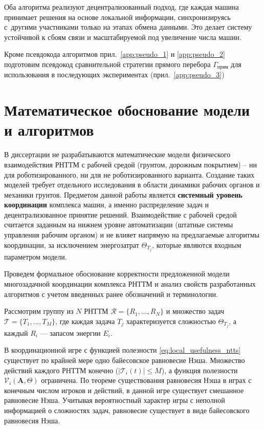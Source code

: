Оба алгоритма реализуют децентрализованный подход, где каждая машина принимает решения на основе локальной информации, синхронизируясь с~другими участниками только на этапах обмена данными. Это делает систему устойчивой к сбоям связи и масштабируемой под увеличение числа машин.

Кроме псевдокода алгоритмов прил.\ \ref{app:pseudo_1} и \ref{app:pseudo_2} подготовим псевдокод сравнительной стратегии прямого перебора $\Gamma_{\text{прям}}$ для использования в последующих экспериментах (прил.\ \ref{app:pseudo_3})

\section{Математическое обоснование модели и алгоритмов}

В диссертации не разрабатываются математические модели физического взаимодействия РНТТМ с рабочей средой (грунтом, дорожным покрытием) -- ни для роботизированного, ни для не роботизированного варианта. Создание таких моделей требует отдельного исследования в области динамики рабочих органов и механики грунтов. Предметом данной работы является \textbf{системный уровень координации} комплекса машин, а именно распределение задач и децентрализованное принятие решений. Взаимодействие с рабочей средой считается заданным на нижнем уровне автоматизации (штатные системы управления рабочим органом) и не влияет напрямую на предлагаемые алгоритмы координации, за исключением энергозатрат \(\Theta_{T_j}\), которые являются входным параметром модели.

Проведем формальное обоснование корректности предложенной модели многозадачной координации комплекса РНТТМ и анализ свойств разработанных алгоритмов с учетом введенных ранее обозначений и терминологии.

Рассмотрим группу из $N$ РНТТМ $\mathcal{R} = \{R_1, \dots, R_N\}$ и множество задач $\mathcal{T} = \{T_1, \dots, T_M\}$, где каждая задача $T_j$ характеризуется сложностью $\Theta_{T_j}$, а каждый $R_i$ --- запасом энергии $E_i$.

В координационной игре с функцией полезности \eqref{eq:local_usefulness_ntts} существует по крайней мере одно байесовское равновесие Нэша. Множество действий каждого РНТТМ конечно ($|\mathcal{T}_i(t)| \leq M$), а функция полезности $\mathcal{V}_i(\mathbf{A}, \Theta)$ ограничена. По теореме существования равновесия Нэша в играх с конечным числом игроков и действий, в данной игре существует смешанное равновесие Нэша. Учитывая вероятностный характер игры с неполной информацией о сложностях задач, равновесие существует в виде байесовского равновесия Нэша.

